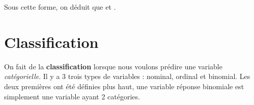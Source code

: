 \documentclass[10pt, french]{article}
\begin{document}
\begin{multicols*}{2}
Sous cette forme, on déduit que  et .

%
%


\columnbreak
\section{Classification}
On fait de la \textbf{classification} lorsque nous voulons prédire une variable \textit{catégorielle}. Il y a 3 trois types de variables : nominal, ordinal et binomial. Les deux premières ont été définies plus haut, une variable réponse binomiale est simplement une variable ayant 2 catégories.


\end{multicols*}
\end{document}
